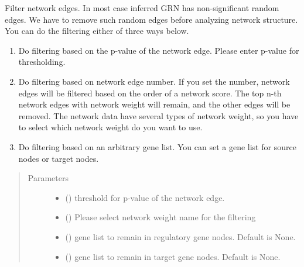 \documentclass[letterpaper,10pt,english]{sphinxmanual}
\begin{document}
\begin{fulllineitems}
\begin{fulllineitems}
\label{\detokenize{modules/celloracle:celloracle.Links.filter_links}}
Filter network edges.
In most case inferred GRN has non-significant random edges.
We have to remove such random edges before analyzing network structure.
You can do the filtering either of three ways below.
\begin{enumerate}
\item {} 
Do filtering based on the p-value of the network edge.
Please enter p-value for thresholding.

\item {} 
Do filtering based on network edge number.
If you set the number, network edges will be filtered based on the order of a network score. The top n-th network edges with network weight will remain, and the other edges will be removed.
The network data have several types of network weight, so you have to select which network weight do you want to use.

\item {} 
Do filtering based on an arbitrary gene list. You can set a gene list for source nodes or target nodes.

\end{enumerate}
\begin{quote}\begin{description}
\item[{Parameters}] \leavevmode\begin{itemize}
\item {} 
 () \textendash{} threshold for p-value of the network edge.

\item {} 
 () \textendash{} Please select network weight name for the filtering

\item {} 
 () \textendash{} gene list to remain in regulatory gene nodes. Default is None.

\item {} 
 () \textendash{} gene list to remain in target gene nodes. Default is None.


\end{itemize}
\end{description}
\end{quote}
\end{fulllineitems}
\end{fulllineitems}
\end{document}
